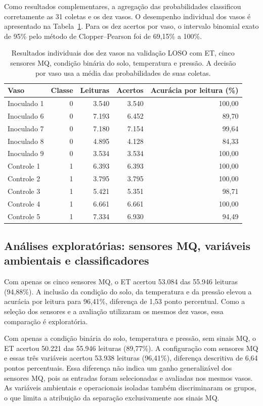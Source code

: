 Como resultados complementares, a agregação das probabilidades classificou corretamente as 31 coletas e os dez vasos. O desempenho individual dos vasos é apresentado na Tabela~\ref{tab:loso_vasos}. Para os dez acertos por vaso, o intervalo binomial exato de 95\% pelo método de Clopper--Pearson foi de 69,15\% a 100\%.

\begin{table}[H]
\centering
\footnotesize
\caption{Resultados individuais dos dez vasos na validação LOSO com ET, cinco sensores MQ, condição binária do solo, temperatura e pressão. A decisão por vaso usa a média das probabilidades de suas coletas.}
\label{tab:loso_vasos}
\begin{tabular}{lrrrr}
\toprule
Vaso & Classe & Leituras & Acertos & Acurácia por leitura (\%) \\
\midrule
Inoculado 1 & 0 & 3.540 & 3.540 & 100,00 \\
Inoculado 6 & 0 & 7.193 & 6.452 & 89,70 \\
Inoculado 7 & 0 & 7.180 & 7.154 & 99,64 \\
Inoculado 8 & 0 & 4.895 & 4.128 & 84,33 \\
Inoculado 9 & 0 & 3.534 & 3.534 & 100,00 \\
Controle 1  & 1 & 6.393 & 6.393 & 100,00 \\
Controle 2  & 1 & 3.795 & 3.795 & 100,00 \\
Controle 3  & 1 & 5.421 & 5.351 & 98,71 \\
Controle 4  & 1 & 6.661 & 6.661 & 100,00 \\
Controle 5  & 1 & 7.334 & 6.930 & 94,49 \\
\bottomrule
\end{tabular}
\end{table}

\subsection{Análises exploratórias: sensores MQ, variáveis ambientais e classificadores}
\label{subsec:res_mq}

Com apenas os cinco sensores MQ, o ET acertou 53.084 das 55.946 leituras (94,88\%). A inclusão da condição do solo, da temperatura e da pressão elevou a acurácia por leitura para 96,41\%, diferença de 1,53 ponto percentual. Como a seleção dos sensores e a avaliação utilizaram os mesmos dez vasos, essa comparação é exploratória.

Com apenas a condição binária do solo, temperatura e pressão, sem sinais MQ, o ET acertou 50.221 das 55.946 leituras (89,77\%). A configuração com sensores MQ e essas três variáveis acertou 53.938 leituras (96,41\%), diferença descritiva de 6,64 pontos percentuais. Essa diferença não indica um ganho generalizável dos sensores MQ, pois as entradas foram selecionadas e avaliadas nos mesmos vasos. As variáveis ambientais e operacionais isoladas também discriminaram os grupos, o que limita a atribuição da separação exclusivamente aos sinais MQ.

